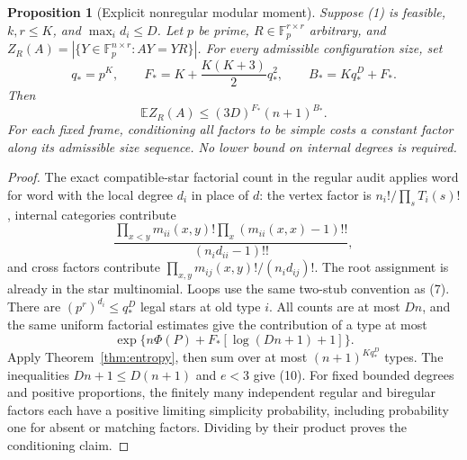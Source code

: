 \documentclass[11pt]{article}
\newtheorem{proposition}{Proposition}
\newcommand{\E}{\mathbb E}
\begin{document}
\begin{proposition}[Explicit nonregular modular moment]\label{prop:moment}
Suppose (1) is feasible, $k,r\leq K$, and $\max_i d_i\leq D$.
Let $p$ be prime, $R\in\mathbb F_p^{r\times r}$ arbitrary, and
$Z_R(A)=|\{Y\in\mathbb F_p^{n\times r}:AY=YR\}|$.
For every admissible configuration size, set
\[
 q_*=p^K,\qquad F_*=K+\frac{K(K+3)}2q_*^2,
 \qquad B_*=Kq_*^D+F_*.
\]
Then
\[
 \E Z_R(A)\leq(3D)^{F_*}(n+1)^{B_*}.              \tag{10}
\]
For each fixed frame, conditioning all factors to be simple costs a
constant factor along its admissible size sequence. No lower bound on
internal degrees is required.
\end{proposition}
\begin{proof}
The exact compatible-star factorial count in the regular audit applies
word for word with the local degree $d_i$ in place of $d$: the vertex
factor is $n_i!/\prod_sT_i(s)!$, internal categories contribute
\[
 \frac{\prod_{x<y}m_{ii}(x,y)!\prod_x(m_{ii}(x,x)-1)!!}
 {(n_id_{ii}-1)!!},
\]
and cross factors contribute
$\prod_{x,y}m_{ij}(x,y)!/(n_id_{ij})!$.
The root assignment is already in the star multinomial.
Loops use the same two-stub convention as (7).
There are $(p^r)^{d_i}\leq q_*^D$ legal stars at old type $i$.
All counts are at most $Dn$, and the same uniform factorial estimates
give the contribution of a type at most
\[
 \exp\{n\Phi(P)+F_*[\log(Dn+1)+1]\}.
\]
Apply Theorem~\ref{thm:entropy}, then sum over at most
$(n+1)^{Kq_*^D}$ types. The inequalities $Dn+1\leq D(n+1)$ and
$e<3$ give (10). For fixed bounded degrees and positive proportions,
the finitely many independent regular and biregular factors each have
a positive limiting simplicity probability, including probability one
for absent or matching factors. Dividing by their product proves the
conditioning claim.
\end{proof}
\end{document}
